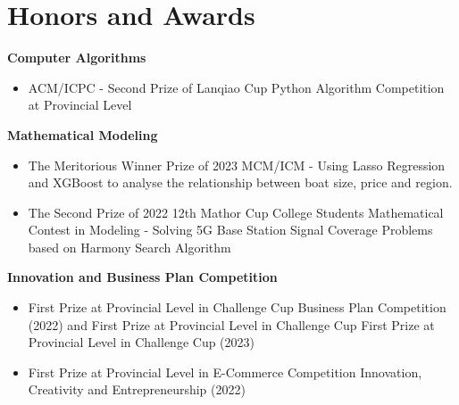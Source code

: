 \documentclass{chicv}
\begin{document}
\section{Honors and Awards}
\begin{compactlist}
  \item \textbf{Computer Algorithms}
    \begin{itemize}
      \item ACM/ICPC - Second Prize of Lanqiao Cup Python Algorithm Competition at Provincial Level
    \end{itemize}
  \item \textbf{Mathematical Modeling}
    \begin{itemize}
      \item The Meritorious Winner Prize of 2023 MCM/ICM - Using Lasso Regression and XGBoost to analyse the relationship between boat size, price and region.
      \item The Second Prize of 2022 12th Mathor Cup College Students Mathematical Contest in Modeling - Solving 5G Base Station Signal Coverage Problems based on Harmony Search Algorithm
    \end{itemize}
  \item \textbf{Innovation and Business Plan Competition}
    \begin{itemize}
      \item First Prize at Provincial Level in Challenge Cup Business Plan Competition (2022) and First Prize at Provincial Level in Challenge Cup First Prize at Provincial Level in Challenge Cup (2023)
      \item First Prize at Provincial Level in E-Commerce Competition Innovation, Creativity and Entrepreneurship (2022)
    \end{itemize}
\end{compactlist}
%
%
\end{document}
